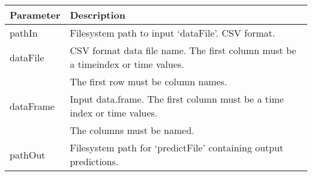 \documentclass[]{article}
\begin{document}
\begin{longtable}[]{@{}ll@{}}
\toprule
\begin{minipage}[b]{0.09\columnwidth}\raggedright
Parameter\strut
\end{minipage} & \begin{minipage}[b]{0.85\columnwidth}\raggedright
Description\strut
\end{minipage}\tabularnewline
\midrule
\endhead
\begin{minipage}[t]{0.09\columnwidth}\raggedright
pathIn\strut
\end{minipage} & \begin{minipage}[t]{0.85\columnwidth}\raggedright
Filesystem path to input `dataFile'. CSV format.\strut
\end{minipage}\tabularnewline
\begin{minipage}[t]{0.09\columnwidth}\raggedright
dataFile\strut
\end{minipage} & \begin{minipage}[t]{0.85\columnwidth}\raggedright
CSV format data file name. The first column must be a timeindex or time
values.\strut
\end{minipage}\tabularnewline
\begin{minipage}[t]{0.09\columnwidth}\raggedright
\strut
\end{minipage} & \begin{minipage}[t]{0.85\columnwidth}\raggedright
The first row must be column names.\strut
\end{minipage}\tabularnewline
\begin{minipage}[t]{0.09\columnwidth}\raggedright
dataFrame\strut
\end{minipage} & \begin{minipage}[t]{0.85\columnwidth}\raggedright
Input data.frame. The first column must be a time index or time
values.\strut
\end{minipage}\tabularnewline
\begin{minipage}[t]{0.09\columnwidth}\raggedright
\strut
\end{minipage} & \begin{minipage}[t]{0.85\columnwidth}\raggedright
The columns must be named.\strut
\end{minipage}\tabularnewline
\begin{minipage}[t]{0.09\columnwidth}\raggedright
pathOut\strut
\end{minipage} & \begin{minipage}[t]{0.85\columnwidth}\raggedright
Filesystem path for `predictFile' containing output predictions.\strut

\end{minipage}
\end{longtable}
\end{document}
